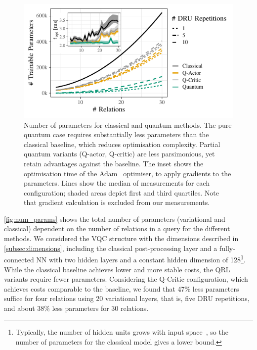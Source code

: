\documentclass[10pt, conference]{IEEEtran}
\begin{document}
\begin{figure}[htbp]
  \includegraphics{img-gen/num_params.pdf}\vspace*{-1em}
  \caption{Number of parameters for classical and quantum methods. The pure 
  quantum case requires substantially less parameters than the classical baseline,
  which reduces optimisation complexity. Partial quantum variants (Q-actor, Q-critic)
  are less parsimonious, yet retain advantages against the baseline. The inset shows the optimisation time of the Adam~\cite{kingma17} optimiser, to apply gradients to the parameters. Lines show the median of  measurements for each configuration; shaded areas depict first and third quartiles. Note that gradient calculation is excluded from our measurements.}
  \label{fig:num_params}
\end{figure}

\autoref{fig:num_params} shows the total number of parameters 
(variational and classical) dependent on the number of relations in 
a query for the different methods.
We considered the VQC structure with the dimensions described in \autoref{subsec:dimensions}, including the classical post-processing layer and a fully-connected NN with two hidden layers and a constant hidden dimension of 128\footnote{Typically, the number of hidden units grows with input space~\cite{sheela13}, so 
the number of parameters for the classical model gives a lower bound.}.
While the classical baseline achieves lower and more stable costs, the QRL variants require fewer parameters.
Considering the Q-Critic configuration, which achieves costs 
comparable to the baseline, we found that 47\% less parameters suffice for four relations using 20 variational layers, that is, five DRU repetitions, and about 38\% less parameters for 30 relations.
\end{document}
